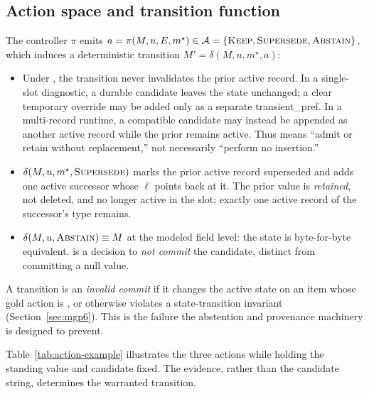 \subsection{Action space and transition function}
\label{sec:actionspace}

The controller $\pi$ emits
$a=\pi(M,u,E,m^{\star}) \in \mathcal{A} =
\{\textsc{Keep}, \textsc{Supersede}, \textsc{Abstain}\}$, which induces a deterministic transition
$M' = \delta(M,u,m^{\star},a)$:
\begin{itemize}[leftmargin=1.5em,topsep=2pt,itemsep=1pt]
\item Under \keep{}, the transition never invalidates the prior active record.
In a single-slot diagnostic, a durable candidate leaves the state unchanged;
a clear temporary override may be added only as a separate
\textsf{transient\_pref}. In a multi-record runtime, a compatible candidate may
instead be appended as another active record while the prior remains active.
Thus \keep{} means ``admit or retain without replacement,'' not necessarily
``perform no insertion.''
\item $\delta(M, u, m^{\star}, \textsc{Supersede})$ marks the prior active record
\textsf{superseded} and adds one \textsf{active} successor whose $\ell$ points back
at it. The prior value is \emph{retained}, not deleted, and no longer active in
the slot; exactly one active record of the successor's type remains.
\item $\delta(M, u, \textsc{Abstain}) \equiv M$ at the modeled field level: the state is
byte-for-byte equivalent. \abstain{} is a decision to \emph{not commit} the
candidate, distinct from committing a null value.
\end{itemize}
A transition is an \emph{invalid commit} if it changes the active state on an item
whose gold action is \abstain, or otherwise violates a state-transition invariant
(Section~\ref{sec:mgp6}). This is the failure the abstention and provenance
machinery is designed to prevent.

Table~\ref{tab:action-example} illustrates the three actions while holding the
standing value and candidate fixed. The evidence, rather than the candidate
string, determines the warranted transition.

